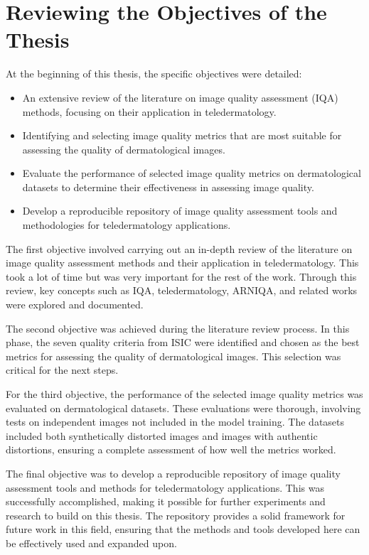 \section{Reviewing the Objectives of the Thesis}
\label{sec:ReviewingObjectives}
At the beginning of this thesis, the specific objectives were detailed:

\begin{itemize}
    \item An extensive review of the literature on image quality assessment (IQA) methods, focusing on their application in teledermatology.
    \item Identifying and selecting image quality metrics that are most suitable for assessing the quality of dermatological images.
    \item Evaluate the performance of selected image quality metrics on dermatological datasets to determine their effectiveness in assessing image quality.
    \item Develop a reproducible repository of image quality assessment tools and methodologies for teledermatology applications.
\end{itemize}
\noindent
The first objective involved carrying out an in-depth review of the literature on image quality assessment methods and their application in teledermatology. This took a lot of time but was very important for the rest of the work. Through this review, key concepts such as IQA, teledermatology, ARNIQA, and related works were explored and documented. \par
\vspace{\baselineskip}
\noindent
The second objective was achieved during the literature review process. In this phase, the seven quality criteria from ISIC were identified and chosen as the best metrics for assessing the quality of dermatological images. This selection was critical for the next steps. \par
\vspace{\baselineskip}
\noindent
For the third objective, the performance of the selected image quality metrics was evaluated on dermatological datasets. These evaluations were thorough, involving tests on independent images not included in the model training. The datasets included both synthetically distorted images and images with authentic distortions, ensuring a complete assessment of how well the metrics worked. \par
\vspace{\baselineskip}
\noindent
The final objective was to develop a reproducible repository of image quality assessment tools and methods for teledermatology applications. This was successfully accomplished, making it possible for further experiments and research to build on this thesis. The repository provides a solid framework for future work in this field, ensuring that the methods and tools developed here can be effectively used and expanded upon. \par

